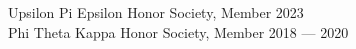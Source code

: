 Upsilon Pi Epsilon Honor Society, Member \hfill 2023 \\
Phi Theta Kappa Honor Society, Member	\hfill 2018 --- 2020
